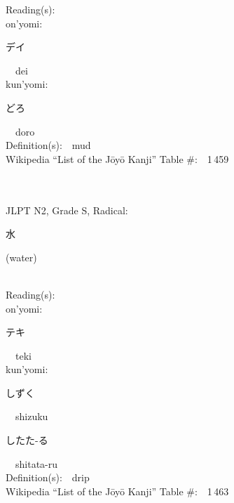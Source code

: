 \begin{multicols}{2}
Reading(s):\ \ \\
{\hspace*{1em}}on'yomi:\ \ \\
{\hspace*{2em}}{\begin{CJK}{UTF8}{min} デイ \end{CJK}}\ \ dei\ \ \\
{\hspace*{1em}}kun'yomi:\ \ \\
{\hspace*{2em}}{\begin{CJK}{UTF8}{min} どろ \end{CJK}}\ \ doro\ \ \\
Definition(s):\ \ mud \\
Wikipedia ``List of the J\=oy\=o Kanji'' Table \#:\ \ 1\,459 \\
\ \ \\
{\fontsize{34pt}{40pt}  }\ \ \\  %
{JLPT N2, Grade S, Radical:\ \ {\begin{CJK}{UTF8}{min} 水 \end{CJK}} (water) } \\
Reading(s):\ \ \\
{\hspace*{1em}}on'yomi:\ \ \\
{\hspace*{2em}}{\begin{CJK}{UTF8}{min} テキ \end{CJK}}\ \ teki\ \ \\
{\hspace*{1em}}kun'yomi:\ \ \\
{\hspace*{2em}}{\begin{CJK}{UTF8}{min} しずく \end{CJK}}\ \ shizuku\ \ \\
{\hspace*{2em}}{\begin{CJK}{UTF8}{min} したた-る \end{CJK}}\ \ shitata-ru\ \ \\
Definition(s):\ \ drip \\
Wikipedia ``List of the J\=oy\=o Kanji'' Table \#:\ \ 1\,463 \\
\ \ \\

\end{multicols}
